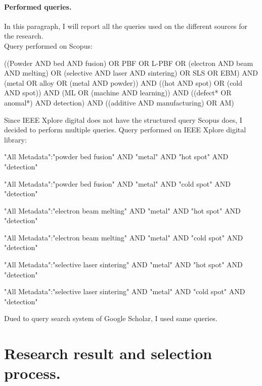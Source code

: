 \paragraph{Performed queries.} In this paragraph, I will report all the queries used on the different sources for the research. \\[1.5ex]
Query performed on Scopus:
\begin{tcolorbox}
\footnotesize
((Powder AND bed AND fusion) OR PBF OR L-PBF OR (electron AND beam AND melting) OR (selective AND laser AND sintering) OR SLS OR EBM) AND (metal OR alloy OR (metal AND powder)) AND  ((hot AND spot) OR (cold AND spot)) AND (ML OR (machine AND learning)) AND ((defect* OR anomal*) AND detection) AND ((additive AND manufacturing) OR AM)
\end{tcolorbox}
Since IEEE Xplore digital does not have the structured query Scopus does, I decided to perform multiple queries. Query performed on IEEE Xplore digital library:
\begin{tcolorbox}
\footnotesize
"All Metadata":"powder bed fusion" AND "metal" AND "hot spot" AND "detection"
\end{tcolorbox}
\begin{tcolorbox}
\footnotesize
"All Metadata":"powder bed fusion" AND "metal" AND "cold spot" AND "detection"
\end{tcolorbox}
\begin{tcolorbox}
\footnotesize
"All Metadata":"electron beam melting" AND "metal" AND "hot spot" AND "detection"
\end{tcolorbox}
\begin{tcolorbox}
\footnotesize
"All Metadata":"electron beam melting" AND "metal" AND "cold spot" AND "detection"
\end{tcolorbox}
\begin{tcolorbox}
\footnotesize
"All Metadata":"selective laser sintering" AND "metal" AND "hot spot" AND "detection"
\end{tcolorbox}
\begin{tcolorbox}
\footnotesize
"All Metadata":"selective laser sintering" AND "metal" AND "cold spot" AND "detection"
\end{tcolorbox}
Dued to query search system of Google Scholar, I used same queries.



\section{Research result and selection process.}
\label{sec:resresults}

